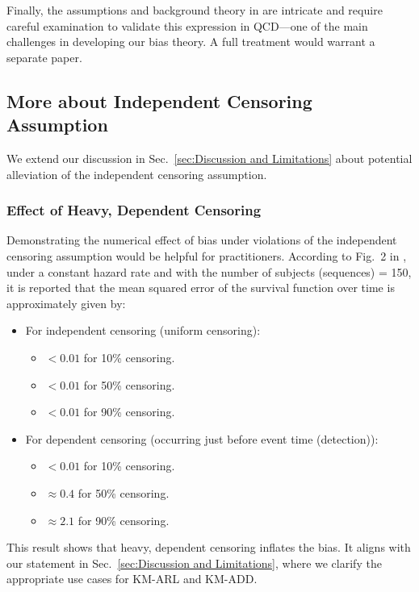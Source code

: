\documentclass{article}
\theoremstyle{plain}
\theoremstyle{definition}
\theoremstyle{remark}
\begin{document}
Finally, the assumptions and background theory in \citet{akritas2000central} are intricate and require careful examination to validate this expression in QCD—one of the main challenges in developing our bias theory. A full treatment would warrant a separate paper.








\subsection{More about Independent Censoring Assumption} \label{app:More_About_Independent_Censoring_Assumption}
We extend our discussion in Sec.~\ref{sec:Discussion and Limitations} about potential alleviation of the independent censoring assumption.

\subsubsection{Effect of Heavy, Dependent Censoring} \label{app:Effect_of_Heavy_Dependent_Censoring}
Demonstrating the numerical effect of bias under violations of the independent censoring assumption would be helpful for practitioners.
According to Fig.~2 in \citep{malmquist2025what}, under a constant hazard rate and with the number of subjects (sequences) = 150, it is reported that the mean squared error of the survival function over time is approximately given by:
\begin{itemize}
    \item For independent censoring (uniform censoring):
        \begin{itemize}
            \item $< 0.01$ for 10\% censoring.
            \item $< 0.01$ for 50\% censoring.
            \item $< 0.01$ for 90\% censoring.
        \end{itemize}
    \item For dependent censoring (occurring just before event time (detection)):
        \begin{itemize}
            \item $< 0.01$ for 10\% censoring.
            \item $\approx 0.4$ for 50\% censoring.
            \item $\approx 2.1$ for 90\% censoring.
        \end{itemize}
\end{itemize}
This result shows that heavy, dependent censoring inflates the bias.
It aligns with our statement in Sec.~\ref{sec:Discussion and Limitations}, where we clarify the appropriate use cases for KM-ARL and KM-ADD.
\end{document}
